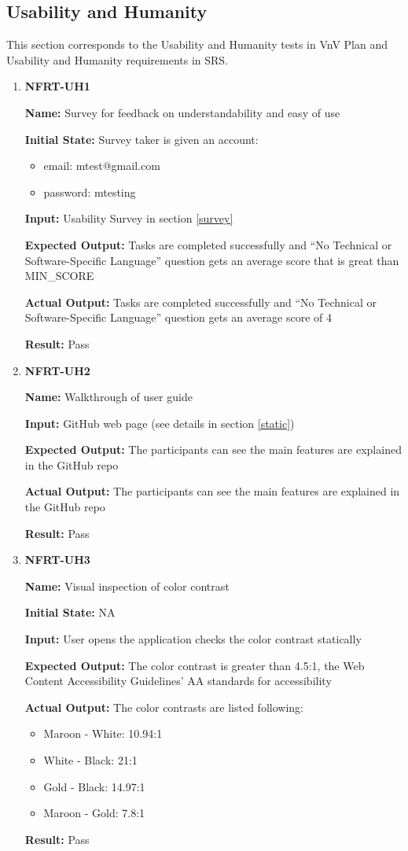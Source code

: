 \documentclass[12pt, titlepage]{article}
\begin{document}
\subsection{Usability and Humanity}
This section corresponds to the Usability and Humanity tests in VnV Plan and Usability and Humanity requirements in SRS.
\begin{enumerate}
\item \textbf{NFRT-UH1}

\textbf{Name:} Survey for feedback on understandability and easy of use

\textbf{Initial State:} Survey taker is given an account:
\begin{itemize}
\item email: mtest@gmail.com
\item password: mtesting
\end{itemize}

\textbf{Input:} Usability Survey in section \ref{survey}

\textbf{Expected Output:} Tasks are completed successfully and ``No Technical or Software-Specific Language'' question gets an average score that is great than MIN\_SCORE

\textbf{Actual Output:} Tasks are completed successfully and ``No Technical or Software-Specific Language'' question gets an average score of 4

\textbf{Result:} Pass

\item \textbf{NFRT-UH2}

\textbf{Name:} Walkthrough of user guide

\textbf{Input:} GitHub web page (see details in section \ref{static})
					
\textbf{Expected Output:} The participants can see the main features are explained in the GitHub repo

\textbf{Actual Output:} The participants can see the main features are explained in the GitHub repo

\textbf{Result:} Pass

\item \textbf{NFRT-UH3}

\textbf{Name:} Visual inspection of color contrast

\textbf{Initial State:} NA
					
\textbf{Input:} User opens the application checks the color contrast statically

\textbf{Expected Output:} The color contrast is greater than 4.5:1,  the Web Content Accessibility Guidelines' AA standards for accessibility

\textbf{Actual Output:} The color contrasts are listed following:
\begin{itemize}
\item Maroon - White: 10.94:1
\item White - Black: 21:1
\item Gold - Black: 14.97:1
\item Maroon - Gold: 7.8:1
\end{itemize}

\textbf{Result:} Pass
\end{enumerate}
\end{document}
